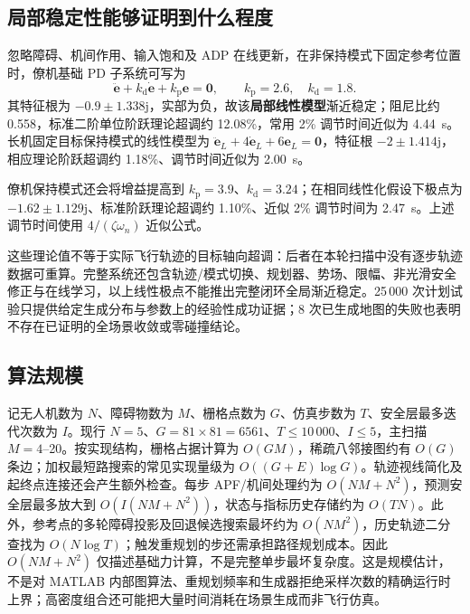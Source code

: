 \documentclass[UTF8,a4paper,11pt,fontset=windows]{ctexart}
\begin{document}
\subsection{局部稳定性能够证明到什么程度}
忽略障碍、机间作用、输入饱和及 ADP 在线更新，在非保持模式下固定参考位置时，僚机基础 PD 子系统可写为
\begin{equation}
\ddot{\bm e}+k_{\mathrm d}\dot{\bm e}+k_{\mathrm p}\bm e=\bm 0,\qquad
k_{\mathrm p}=2.6,\quad k_{\mathrm d}=1.8.
\end{equation}
其特征根为 $-0.9\pm1.338\mathrm j$，实部为负，故该\textbf{局部线性模型}渐近稳定；阻尼比约 0.558，标准二阶单位阶跃理论超调约 12.08\%，常用 2\% 调节时间近似为 \SI{4.44}{s}。长机固定目标保持模式的线性模型为 $\ddot{\bm e}_L+4\dot{\bm e}_L+6\bm e_L=\bm0$，特征根 $-2\pm1.414\mathrm j$，相应理论阶跃超调约 1.18\%、调节时间近似为 \SI{2.00}{s}。

僚机保持模式还会将增益提高到 $k_{\mathrm p}=3.9$、$k_{\mathrm d}=3.24$；在相同线性化假设下极点为 $-1.62\pm1.129\mathrm j$、标准阶跃理论超调约 1.10\%、近似 2\% 调节时间为 \SI{2.47}{s}。上述调节时间使用 $4/(\zeta\omega_n)$ 近似公式。

这些理论值不等于实际飞行轨迹的目标轴向超调：后者在本轮扫描中没有逐步轨迹数据可重算。完整系统还包含轨迹/模式切换、规划器、势场、限幅、非光滑安全修正与在线学习，以上线性极点不能推出完整闭环全局渐近稳定。25\,000 次计划试验只提供给定生成分布与参数上的经验性成功证据；8 次已生成地图的失败也表明不存在已证明的全场景收敛或零碰撞结论。

\subsection{算法规模}
记无人机数为 $N$、障碍物数为 $M$、栅格点数为 $G$、仿真步数为 $T$、安全层最多迭代次数为 $I$。现行 $N=5$、$G=81\times81=6561$、$T\leq10\,000$、$I\leq5$，主扫描 $M=4$--20。按实现结构，栅格占据计算为 $O(GM)$，稀疏八邻接图约有 $O(G)$ 条边；加权最短路搜索的常见实现量级为 $O((G+E)\log G)$。轨迹视线简化及起终点连接还会产生额外检查。每步 APF/机间处理约为 $O(NM+N^2)$，预测安全层最多放大到 $O(I(NM+N^2))$，状态与指标历史存储约为 $O(TN)$。此外，参考点的多轮障碍投影及回退候选搜索最坏约为 $O(NM^2)$，历史轨迹二分查找为 $O(N\log T)$；触发重规划的步还需承担路径规划成本。因此 $O(NM+N^2)$ 仅描述基础力计算，不是完整单步最坏复杂度。这是规模估计，不是对 MATLAB 内部图算法、重规划频率和生成器拒绝采样次数的精确运行时上界；高密度组合还可能把大量时间消耗在场景生成而非飞行仿真。
\end{document}
